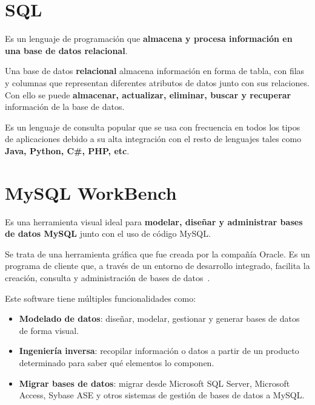 \documentclass[a4paper, 12pt]{book}
\begin{document}
\section{SQL} 
\label{sec:sql}
Es un lenguaje de programación que \textbf{almacena y procesa información en una base de datos relacional}. 

Una base de datos \textbf{relacional} almacena información en forma de tabla, con filas y columnas que representan diferentes atributos de datos junto con sus relaciones. Con ello se puede \textbf{almacenar, actualizar, eliminar, buscar y recuperar} información de la base de datos.

Es un lenguaje de consulta popular que se usa con frecuencia en todos los tipos de aplicaciones debido a su alta integración con el resto de lenguajes tales como \textbf{Java, Python, C\#, PHP, etc}.

\section{MySQL WorkBench} 
\label{sec:mysqlworkbench}

Es una herramienta visual ideal para \textbf{modelar, diseñar y administrar bases de datos MySQL} junto con el uso de código MySQL.

Se trata de una herramienta gráfica que fue creada por la compañía Oracle.
Es un programa de cliente que, a través de un entorno de desarrollo integrado, facilita la creación, consulta y administración de bases de datos~\cite{mysql:_workbench}. 

Este software tiene múltiples funcionalidades como:
\begin{itemize}
	\item \textbf {Modelado de datos}: diseñar, modelar, gestionar y generar bases de datos de forma visual. 
	\item \textbf {Ingeniería inversa}: recopilar información o datos a partir de un producto determinado para saber qué elementos lo componen. 
	\item \textbf {Migrar bases de datos}: migrar desde Microsoft SQL Server, Microsoft Access, Sybase ASE y otros sistemas de gestión de bases de datos a MySQL.
\end{itemize}
\end{document}
